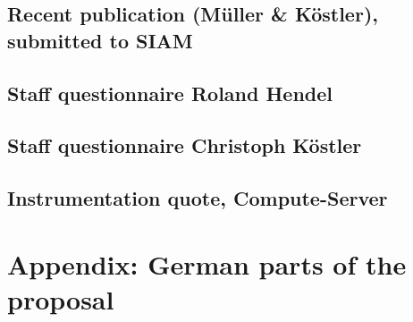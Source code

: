 \documentclass[twoside,10pt]{article}
\begin{document}
\subsection{Recent publication (M\"uller \& K\"ostler), submitted to SIAM}
\subsection{Staff questionnaire Roland Hendel}
\subsection{Staff questionnaire Christoph K\"ostler}
\subsection{Instrumentation quote, Compute-Server}

%
%

\section*{Appendix: German parts of the proposal}



%
%

%

%

\end{document}
